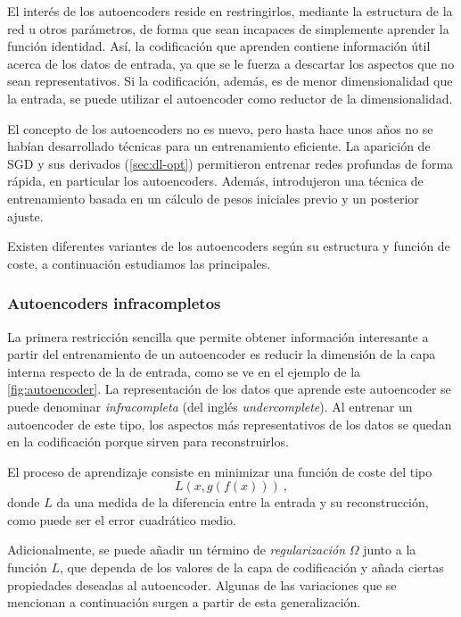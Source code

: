 El interés de los autoencoders reside en restringirlos, mediante la estructura de la red u otros parámetros, de forma que sean incapaces de simplemente aprender la función identidad. Así, la codificación que aprenden contiene información útil acerca de los datos de entrada, ya que se le fuerza a descartar los aspectos que no sean representativos. Si la codificación, además, es de menor dimensionalidad que la entrada, se puede utilizar el autoencoder como reductor de la dimensionalidad.

El concepto de los autoencoders no es nuevo, pero hasta hace unos años no se habían desarrollado técnicas para un entrenamiento eficiente. La aparición de SGD y sus derivados (\autoref{sec:dl-opt}) permitieron entrenar redes profundas de forma rápida, en particular los autoencoders. Además, \textcite{hinton2006autoencoder} introdujeron una técnica de entrenamiento basada en un cálculo de pesos iniciales previo y un posterior ajuste.

Existen diferentes variantes de los autoencoders según su estructura y función de coste, a continuación estudiamos las principales.

\subsubsection{Autoencoders infracompletos}

La primera restricción sencilla que permite obtener información interesante a partir del entrenamiento de un autoencoder es reducir la dimensión de la capa interna respecto de la de entrada, como se ve en el ejemplo de la \autoref{fig:autoencoder}. La representación de los datos que aprende este autoencoder se puede denominar \textit{infracompleta} (del inglés \textit{undercomplete}). Al entrenar un autoencoder de este tipo, los aspectos más representativos de los datos se quedan en la codificación porque sirven para reconstruirlos.

El proceso de aprendizaje consiste en minimizar una función de coste del tipo
\[
  L(x,g(f(x)))~,
\]
donde $L$ da una medida de la diferencia entre la entrada y su reconstrucción, como puede ser el error cuadrático medio.

Adicionalmente, se puede añadir un término de \textit{regularización} $\Omega$ junto a la función $L$, que dependa de los valores de la capa de codificación y añada ciertas propiedades deseadas al autoencoder. Algunas de las variaciones que se mencionan a continuación surgen a partir de esta generalización.

